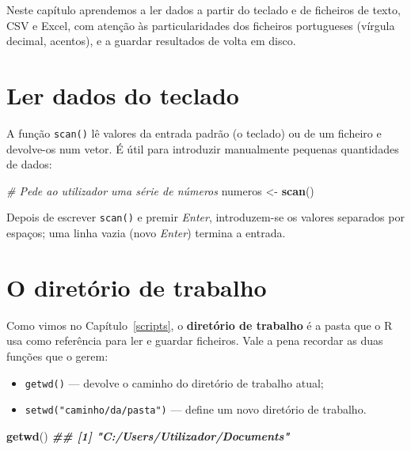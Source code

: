 \documentclass[
  portuguese,
  11pt,
  openany]{book}
\newenvironment{Shaded}{\begin{snugshade}}{\end{snugshade}}
\newcommand{\CommentTok}[1]{\textcolor[rgb]{0.56,0.35,0.01}{\textit{#1}}}
\newcommand{\DocumentationTok}[1]{\textcolor[rgb]{0.56,0.35,0.01}{\textbf{\textit{#1}}}}
\newcommand{\FunctionTok}[1]{\textcolor[rgb]{0.13,0.29,0.53}{\textbf{#1}}}
\newcommand{\NormalTok}[1]{#1}
\newcommand{\OtherTok}[1]{\textcolor[rgb]{0.56,0.35,0.01}{#1}}
\providecommand{\tightlist}{%
  \setlength{\itemsep}{0pt}\setlength{\parskip}{0pt}}
\begin{document}
Neste capítulo aprendemos a ler dados a partir do teclado e de ficheiros de texto,
CSV e Excel, com atenção às particularidades dos ficheiros portugueses (vírgula
decimal, acentos), e a guardar resultados de volta em disco.

\section{Ler dados do teclado}\label{ler-dados-do-teclado}

A função \texttt{scan()} lê valores da entrada padrão (o teclado) ou de um ficheiro e
devolve-os num vetor. É útil para introduzir manualmente pequenas quantidades de
dados:

\begin{Shaded}
\begin{Highlighting}[]
\CommentTok{\# Pede ao utilizador uma série de números}
\NormalTok{numeros }\OtherTok{\textless{}{-}} \FunctionTok{scan}\NormalTok{()}
\end{Highlighting}
\end{Shaded}

Depois de escrever \texttt{scan()} e premir \emph{Enter}, introduzem-se os valores separados por
espaços; uma linha vazia (novo \emph{Enter}) termina a entrada.

\section{O diretório de trabalho}\label{o-diretuxf3rio-de-trabalho-1}

Como vimos no Capítulo~\ref{scripts}, o \textbf{diretório de trabalho} é a pasta que o
R usa como referência para ler e guardar ficheiros. Vale a pena recordar as duas
funções que o gerem:

\begin{itemize}
\tightlist
\item
  \texttt{getwd()} --- devolve o caminho do diretório de trabalho atual;
\item
  \texttt{setwd("caminho/da/pasta")} --- define um novo diretório de trabalho.
\end{itemize}

\begin{Shaded}
\begin{Highlighting}[]
\FunctionTok{getwd}\NormalTok{()}
\DocumentationTok{\#\# [1] "C:/Users/Utilizador/Documents"}
\end{Highlighting}
\end{Shaded}
\end{document}

